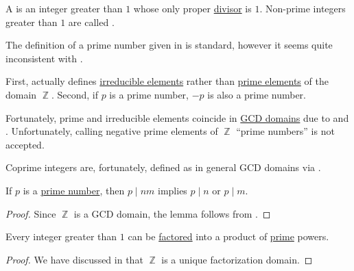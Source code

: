 \begin{definition}\label{def:prime_number}
  A  is an integer greater than \( 1 \) whose only proper \hyperref[def:divisibility]{divisor} is \( 1 \). Non-prime integers greater than \( 1 \) are called .
\end{definition}

\begin{remark}\label{rem:prime_numbers}
  The definition of a prime number given in  is standard, however it seems quite inconsistent with .

  First,  actually defines \hyperref[def:domain_divisibility/irreducible]{irreducible elements} rather than \hyperref[def:domain_divisibility/prime]{prime elements} of the domain \( \BbbZ \). Second, if \( p \) is a prime number, \( -p \) is also a prime number.

  Fortunately, prime and irreducible elements coincide in \hyperref[def:gcd_domain]{GCD domains} due to  and . Unfortunately, calling negative prime elements of \( \BbbZ \) \enquote{prime numbers} is not accepted.

  Coprime integers are, fortunately, defined as in general GCD domains via .
\end{remark}

\begin{lemma}\label{thm:euclids_lemma}
  If \( p \) is a \hyperref[def:prime_number]{prime number}, then \( p \mid nm \) implies \( p \mid n \) or \( p \mid m \).
\end{lemma}
\begin{proof}
  Since \( \BbbZ \) is a GCD domain, the lemma follows from .
\end{proof}

\begin{theorem}\label{thm:fundamental_theorem_of_arithmetic}
  Every integer greater than \( 1 \) can be \hyperref[def:irreducible_factorization]{factored} into a product of \hyperref[def:prime_number]{prime} powers.
\end{theorem}
\begin{proof}
  We have discussed in  that \( \BbbZ \) is a unique factorization domain.
\end{proof}

